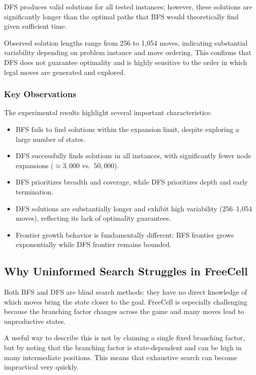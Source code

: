\documentclass{article}
\begin{document}
DFS produces valid solutions for all tested instances; however, these solutions are significantly longer than the optimal paths that BFS would theoretically find given sufficient time.

Observed solution lengths range from 256 to 1,054 moves, indicating substantial variability depending on problem instance and move ordering. This confirms that DFS does not guarantee optimality and is highly sensitive to the order in which legal moves are generated and explored.

\subsubsection{Key Observations}

The experimental results highlight several important characteristics:

\begin{itemize}
\item BFS fails to find solutions within the expansion limit, despite exploring a large number of states.
\item DFS successfully finds solutions in all instances, with significantly fewer node expansions ($\approx 3,000$ vs.\ $50,000$).
\item BFS prioritizes breadth and coverage, while DFS prioritizes depth and early termination.
\item DFS solutions are substantially longer and exhibit high variability (256--1,054 moves), reflecting its lack of optimality guarantees.
\item Frontier growth behavior is fundamentally different: BFS frontier grows exponentially while DFS frontier remains bounded.
\end{itemize}

\subsection{Why Uninformed Search Struggles in FreeCell}

Both BFS and DFS are blind search methods: they have no direct knowledge of which moves bring the state closer to the goal. FreeCell is especially challenging because the branching factor changes across the game and many moves lead to unproductive states.

A useful way to describe this is not by claiming a single fixed branching factor, but by noting that the branching factor is state-dependent and can be high in many intermediate positions. This means that exhaustive search can become impractical very quickly.
\end{document}
